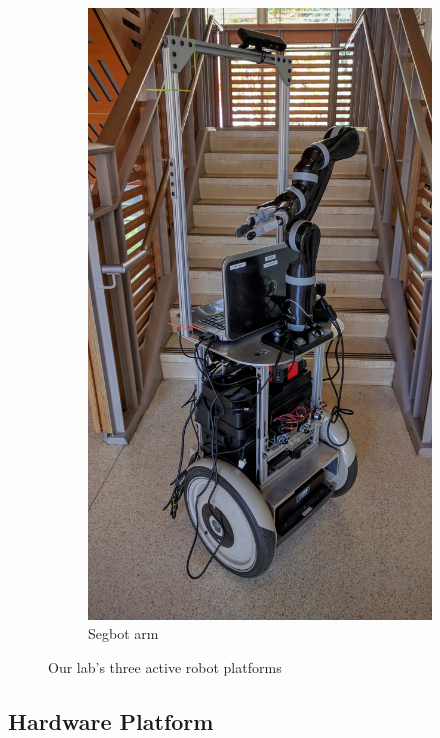 \documentclass[
  oneside,
  11pt, a4paper,
  footinclude=true,
  headinclude=true,
  cleardoublepage=empty
]{article}
\begin{document}
\begin{figure}[!tbp]
\begin{subfigure}[b]{0.3\textwidth}
    \includegraphics[width=\textwidth]{bwi_segbotarm}
    \caption{Segbot arm}
    \label{fig:segbotarm}
  \end{subfigure}
  \caption{Our lab's three active robot platforms}
  \label{fig:robots}
\end{figure}

\subsection{Hardware Platform}
\end{document}
